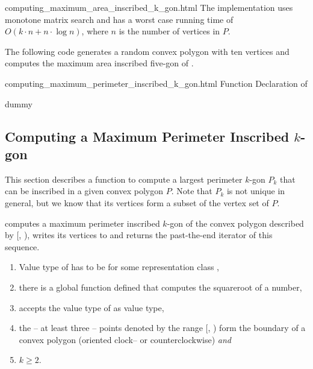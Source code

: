 \begin{ccHtmlClassFile}{computing_maximum_area_inscribed_k_gon.html}
  \ccImplementation The implementation uses monotone matrix
  search\cite{akmsw-gamsa-87} and has a worst case running time of $O(k
  \cdot n + n \cdot \log n)$, where $n$ is the number of vertices in
  $P$.

  \ccExample The following code generates a random convex polygon
   with ten vertices and computes the maximum area inscribed
  five-gon of .


\end{ccHtmlClassFile}
    
\ccHtmlNoClassToc
\begin{ccHtmlClassFile}{computing_maximum_perimeter_inscribed_k_gon.html}
  {Function Declaration of }
  \ccHtmlNoClassIndex\ccHtmlNoClassLinks
  \begin{ccClass}{dummy}
    \ccHtmlNoIndex\subsection{Computing a Maximum Perimeter Inscribed
      $k$-gon}
    \label{secMaximumPerimeterInscribedKgon}
  \end{ccClass}
  
  This section describes a function to compute a largest perimeter
  $k$-gon $P_k$ that can be inscribed in a given convex polygon $P$.
  Note that $P_k$ is not unique in general, but we know that its
  vertices form a subset of the vertex set of $P$.


  \def\ccLongParamLayout{\ccTrue}
  
  computes a maximum perimeter inscribed $k$-gon of the convex polygon
  described by [, ), writes its
  vertices to  and returns the past-the-end iterator of this
  sequence.

  \begin{enumerate}
  \item Value type of  has to be
     for some representation class ,
  \item there is a global function 
    defined that computes the squareroot of a number,
  \item {} accepts the value type of
     as value type,
  \item the -- at least three -- points denoted by the range
    [, ) form the boundary of a
    convex polygon (oriented clock-- or counterclockwise) \textit{and}
  \item $k \ge 2$.
  \end{enumerate}


\end{ccHtmlClassFile}

